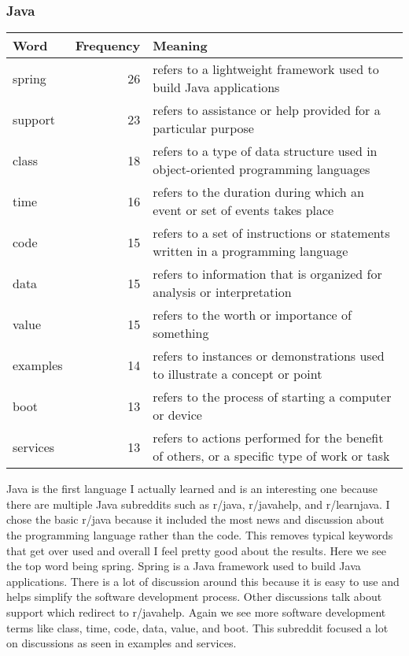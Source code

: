\documentclass{article}
\theoremstyle{theorem}
\theoremstyle{definition}
\theoremstyle{remark}
\begin{document}
\subsubsection{Java}
\begin{tabular}{ | l | r | p{7cm} | }
\hline
Word & Frequency & Meaning \\
\hline
spring & 26 & refers to a lightweight framework used to build Java applications \\
\hline
support & 23 & refers to assistance or help provided for a particular purpose \\
\hline
class & 18 & refers to a type of data structure used in object-oriented programming languages \\
\hline
time & 16 & refers to the duration during which an event or set of events takes place \\
\hline
code & 15 & refers to a set of instructions or statements written in a programming language \\
\hline
data & 15 & refers to information that is organized for analysis or interpretation \\
\hline
value & 15 & refers to the worth or importance of something \\
\hline
examples & 14 & refers to instances or demonstrations used to illustrate a concept or point \\
\hline
boot & 13 & refers to the process of starting a computer or device \\
\hline
services & 13 & refers to actions performed for the benefit of others, or a specific type of work or task \\
\hline
\end{tabular}

\medskip
Java is the first language I actually learned and is an interesting one because there are multiple Java subreddits such as r/java, r/javahelp, and r/learnjava. I chose the basic r/java because it included the most news and discussion about the programming language rather than the code. This removes typical keywords that get over used and overall I feel pretty good about the results. Here we see the top word being spring. Spring is a Java framework used to build Java applications. There is a lot of discussion around this because it is easy to use and helps simplify the software development process. Other discussions talk about support which redirect to r/javahelp. Again we see more software development terms like class, time, code, data, value, and boot. This subreddit focused a lot on discussions as seen in examples and services.
\end{document}
